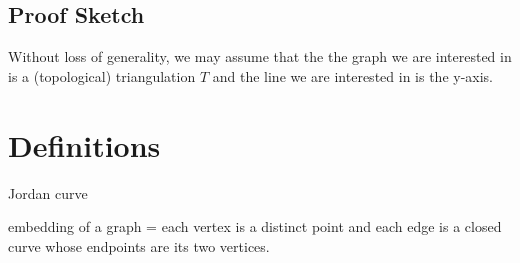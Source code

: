 \documentclass{patmorin}
\begin{document}
\subsection{Proof Sketch}


Without loss of generality, we may assume that the the graph we are
interested in is a (topological) triangulation $T$ and the line we are
interested in is the y-axis.

%
%
%




\section{Definitions}

Jordan curve

embedding of a graph = each vertex is a distinct point and each edge is a closed curve whose endpoints are its two vertices.  
\end{document}
